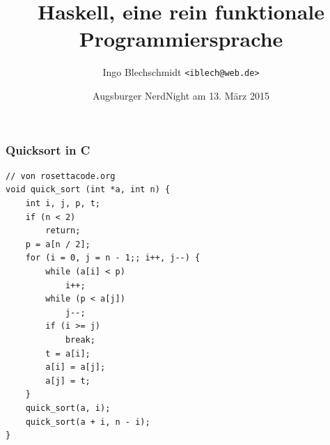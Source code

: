 \documentclass[12pt,compress,ngerman,utf8,t]{beamer}
\title{Haskell, eine rein funktionale Programmiersprache}
\author{Ingo Blechschmidt \texttt{<iblech@web.de>}}
\date{Augsburger NerdNight am 13. März 2015}
\begin{document}


\begin{frame}[fragile]\frametitle{Quicksort in C}
  \scriptsize\vspace{-0.5em}
  \begin{verbatim}
// von rosettacode.org
void quick_sort (int *a, int n) {
    int i, j, p, t;
    if (n < 2)
        return;
    p = a[n / 2];
    for (i = 0, j = n - 1;; i++, j--) {
        while (a[i] < p)
            i++;
        while (p < a[j])
            j--;
        if (i >= j)
            break;
        t = a[i];
        a[i] = a[j];
        a[j] = t;
    }
    quick_sort(a, i);
    quick_sort(a + i, n - i);
}
  \end{verbatim}
\end{frame}
\end{document}
